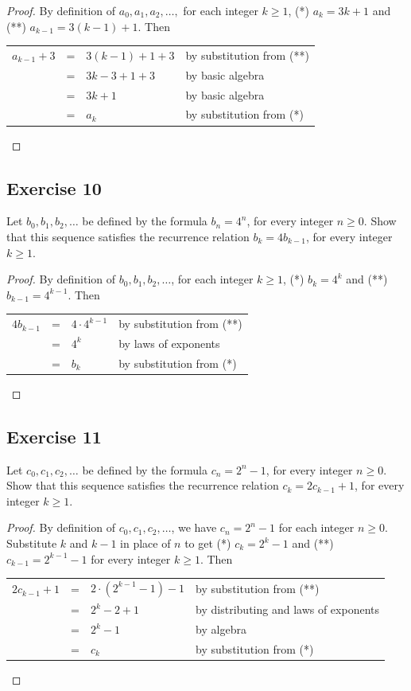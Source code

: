 \documentclass[14pt]{extarticle}
\newcommand{\cy}{\color{cyan}}
\begin{document}
\begin{proof}
By definition of $a_0, a_1, a_2, \ldots,$ for each integer $k \geq 1$, (*) $a_k = 3k + 1$ and 
(**) $a_{k-1} = 3(k - 1) + 1$. Then 

\begin{tabular}{lcll}
$a_{k-1} + 3$ & = & $3(k - 1) + 1 + 3$ & {\cy by substitution from (**)} \\
& = & $3k - 3 + 1 + 3$ & {\cy by basic algebra} \\
& = & $3k+1$ & {\cy by basic algebra} \\
& = & $a_k$ & {\cy by substitution from (*)} \\
\end{tabular}
\end{proof}

\subsection{Exercise 10}
Let $b_0, b_1, b_2, \ldots$ be defined by the formula $b_n = 4^n$, for every integer $n \geq 0$. Show that this 
sequence satisfies the recurrence relation $b_k = 4b_{k - 1}$, for every integer $k \geq 1$.

\begin{proof}
By definition of $b_0, b_1, b_2, \ldots$, for each integer $k \geq 1$, (*) $b_k = 4^k$ and 
(**) $b_{k-1} = 4^{k - 1}$. Then 

\begin{tabular}{lcll}
$4b_{k-1}$ & = & $4 \cdot 4^{k - 1}$ & {\cy by substitution from (**)} \\
& = & $4^k$ & {\cy by laws of exponents} \\
& = & $b_k$ & {\cy by substitution from (*)} \\
\end{tabular}
\end{proof}

\subsection{Exercise 11}
Let $c_0, c_1, c_2, \ldots$ be defined by the formula $c_n = 2^n - 1$, for every integer $n \geq 0$. Show that this 
sequence satisfies the recurrence relation $c_k = 2c_{k - 1} + 1$, for every integer $k \geq 1$.

\begin{proof}
By definition of $c_0, c_1, c_2, \ldots$, we have $c_n = 2^n-1$ for each integer $n \geq 0$. Substitute $k$ and 
$k-1$ in place of $n$ to get (*) $c_k = 2^k - 1$ and (**) $c_{k-1} = 2^{k - 1} - 1$ for every integer $k \geq 1$. Then 

\begin{tabular}{lcll}
$2c_{k - 1} + 1$ & = & $2 \cdot (2^{k - 1} - 1) - 1$ & {\cy by substitution from (**)} \\
& = & $2^k - 2 + 1$ & {\cy by distributing and laws of exponents} \\
& = & $2^k - 1$ & {\cy by algebra} \\
& = & $c_k$ & {\cy by substitution from (*)} \\
\end{tabular}
\end{proof}
\end{document}
